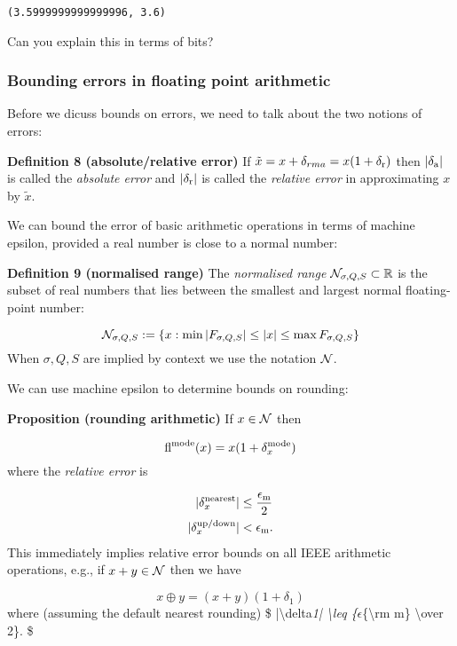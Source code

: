 \documentclass[12pt,a4paper]{article}
\begin{document}
\begin{lstlisting}
(3.5999999999999996, 3.6)
\end{lstlisting}


Can you explain this in terms of bits?

\subsubsection{Bounding errors in floating point arithmetic}
Before we dicuss bounds on errors, we need to talk about the two notions of errors:

\textbf{Definition 8 (absolute/relative error)} If $\tilde x = x + \ensuremath{\delta}_{rm a} = x (1 + \ensuremath{\delta}_{\rm r})$ then $|\ensuremath{\delta}_{\rm a}|$ is called the \emph{absolute error} and $|\ensuremath{\delta}_{\rm r}|$ is called the \emph{relative error} in approximating $x$ by $\tilde x$.

We can bound the error of basic arithmetic operations in terms of machine epsilon, provided a real number is close to a normal number:

\textbf{Definition 9 (normalised range)} The \emph{normalised range} ${\cal N}_{\ensuremath{\sigma},Q,S} \subset {\mathbb R}$ is the subset of real numbers that lies between the smallest and largest normal floating-point number:

\[
{\cal N}_{\ensuremath{\sigma},Q,S} := \{x : \min |F_{\ensuremath{\sigma},Q,S}| \leq |x| \leq \max F_{\ensuremath{\sigma},Q,S} \}
\]
When $\ensuremath{\sigma},Q,S$ are implied by context we use the notation ${\cal N}$.

We can use machine epsilon to determine bounds on rounding:

\textbf{Proposition (rounding arithmetic)} If $x \in {\cal N}$ then

\[
{\rm fl}^{\rm mode}(x) = x (1 + \delta_x^{\rm mode})
\]
where the \emph{relative error} is


\begin{align*}
|\delta_x^{\rm nearest}| &\leq {\ensuremath{\epsilon}_{\rm m} \over 2} \\
|\delta_x^{\rm up/down}| &< {\ensuremath{\epsilon}_{\rm m}}.
\end{align*}
This immediately implies relative error bounds on all IEEE arithmetic operations, e.g., if $x+y \in {\cal N}$ then we have

\[
x \oplus y = (x+y) (1 + \delta_1)
\]
where (assuming the default nearest rounding) \$ |{\textbackslash}delta\emph{1| {\textbackslash}leq \{\ensuremath{\epsilon}}\{{\textbackslash}rm m\} {\textbackslash}over 2\}. \$
\end{document}
